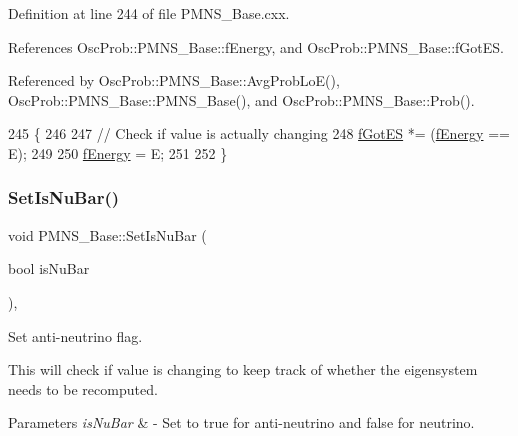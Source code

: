 Definition at line 244 of file P\+M\+N\+S\+\_\+\+Base.\+cxx.



References Osc\+Prob\+::\+P\+M\+N\+S\+\_\+\+Base\+::f\+Energy, and Osc\+Prob\+::\+P\+M\+N\+S\+\_\+\+Base\+::f\+Got\+ES.



Referenced by Osc\+Prob\+::\+P\+M\+N\+S\+\_\+\+Base\+::\+Avg\+Prob\+Lo\+E(), Osc\+Prob\+::\+P\+M\+N\+S\+\_\+\+Base\+::\+P\+M\+N\+S\+\_\+\+Base(), and Osc\+Prob\+::\+P\+M\+N\+S\+\_\+\+Base\+::\+Prob().


\begin{DoxyCode}
245 \{
246 
247   \textcolor{comment}{// Check if value is actually changing}
248   \hyperlink{classOscProb_1_1PMNS__Base_a6dc5cd010d2d70b2324745b4e53e9839}{fGotES} *= (\hyperlink{classOscProb_1_1PMNS__Base_a2800af6d436972f3e900867790c046b0}{fEnergy} == E);
249 
250   \hyperlink{classOscProb_1_1PMNS__Base_a2800af6d436972f3e900867790c046b0}{fEnergy} = E;
251 
252 \}
\end{DoxyCode}
\mbox{\label{classOscProb_1_1PMNS__Base_a717e0348cf762f3961854e332a9b52e0}} 
\subsubsection{\texorpdfstring{Set\+Is\+Nu\+Bar()}{SetIsNuBar()}}
{\footnotesize\ttfamily void P\+M\+N\+S\+\_\+\+Base\+::\+Set\+Is\+Nu\+Bar (\begin{DoxyParamCaption}\item[{bool}]{is\+Nu\+Bar }\end{DoxyParamCaption})\hspace{0.3cm}{\ttfamily [virtual]}, {\ttfamily [inherited]}}

Set anti-\/neutrino flag.

This will check if value is changing to keep track of whether the eigensystem needs to be recomputed.


\begin{DoxyParams}{Parameters}
{\em is\+Nu\+Bar} & -\/ Set to true for anti-\/neutrino and false for neutrino. \\
\hline
\end{DoxyParams}



